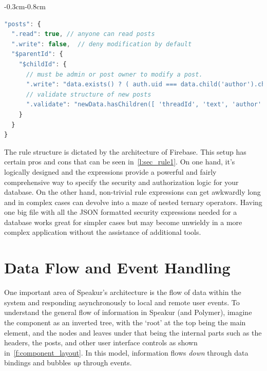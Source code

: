 \begin{changemargin}{-0.3cm}{-0.8cm}
\begin{lstlisting}[language=JavaScript,caption=
{Security rules for the \tcode{posts} table (user messages).},label=l:sec_rule1,captionpos=below]
"posts": {
  ".read": true, // anyone can read posts
  ".write": false,  // deny modification by default
  "$parentId": {
    "$childId": {
      // must be admin or post owner to modify a post.
      ".write": "data.exists() ? ( auth.uid === data.child('author').child('uid').val() || root.child('admins').child(auth.uid).child('scope').val() === '*' ) : true",
      // validate structure of new posts
      ".validate": "newData.hasChildren([ 'threadId', 'text', 'author' ]) && newData.child('timestamp').val() > 1"
    }
  }
}
\end{lstlisting}
\end{changemargin}

The rule structure is dictated by the architecture of Firebase.
This setup has certain pros and cons that can be seen in~\cref{l:sec_rule1}. 
On one hand, it's logically designed and the expressions provide a powerful and fairly comprehensive way to specify the 
security and authorization logic for your database.
On the other hand, non-trivial rule expressions can get awkwardly long and in complex cases can devolve into a maze of nested ternary operators.
Having one big file with all the JSON formatted security expressions needed for a database works great for simpler cases but may become unwieldy in a more complex application without the assistance of additional tools.


\section{Data Flow and Event Handling}
One important area of Speakur's architecture is the flow of data within the system and responding asynchronously to local and remote user events.
To understand the general flow of information in Speakur (and Polymer), imagine the component as an inverted tree, with the `root' at the top being the main  element, 
and the nodes and leaves under that being the internal parts such as the headers, the posts, and other user interface controls as shown in~\cref{f:component_layout}.
In this model, information flows \textit{down} through data bindings and bubbles \textit{up} through events.

